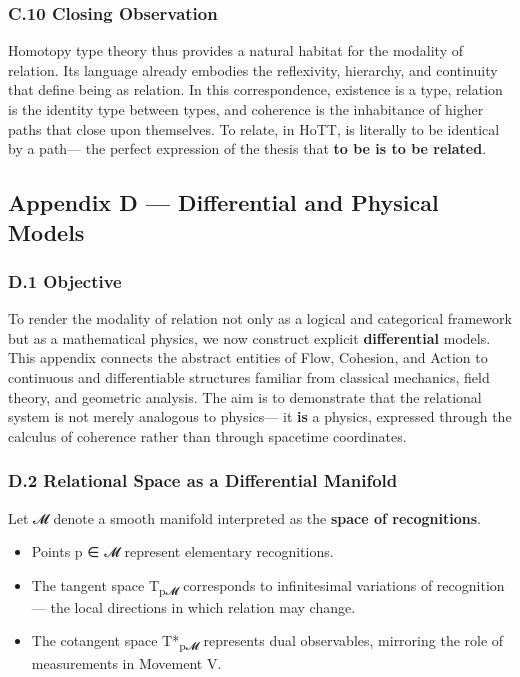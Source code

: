 \documentclass[11pt]{article}
\begin{document}
\subsubsection*{C.10 Closing Observation}
\label{sec:orge84288a}
Homotopy type theory thus provides a natural habitat for the modality of relation.  
Its language already embodies the reflexivity, hierarchy, and continuity  
that define being as relation.  
In this correspondence, existence is a type,  
relation is the identity type between types,  
and coherence is the inhabitance of higher paths that close upon themselves.  
To relate, in HoTT, is literally to be identical by a path—  
the perfect expression of the thesis that \textbf{to be is to be related}.
\subsection*{Appendix D — Differential and Physical Models}
\label{sec:orgb9a58c3}

\subsubsection*{D.1 Objective}
\label{sec:org4080267}
To render the modality of relation not only as a logical and categorical framework  
but as a mathematical physics, we now construct explicit \textbf{differential} models.  
This appendix connects the abstract entities of Flow, Cohesion, and Action  
to continuous and differentiable structures familiar from classical mechanics,  
field theory, and geometric analysis.  
The aim is to demonstrate that the relational system is not merely analogous to physics—  
it \textbf{is} a physics, expressed through the calculus of coherence rather than through spacetime coordinates.
\subsubsection*{D.2 Relational Space as a Differential Manifold}
\label{sec:org9348769}
Let 𝓜 denote a smooth manifold interpreted as the \textbf{space of recognitions}.

\begin{itemize}
\item Points p ∈ 𝓜 represent elementary recognitions.
\item The tangent space T\textsubscript{p𝓜} corresponds to infinitesimal variations of recognition—  
the local directions in which relation may change.
\item The cotangent space T*\textsubscript{p𝓜} represents dual observables,  
mirroring the role of measurements in Movement V.
\end{itemize}
\end{document}
